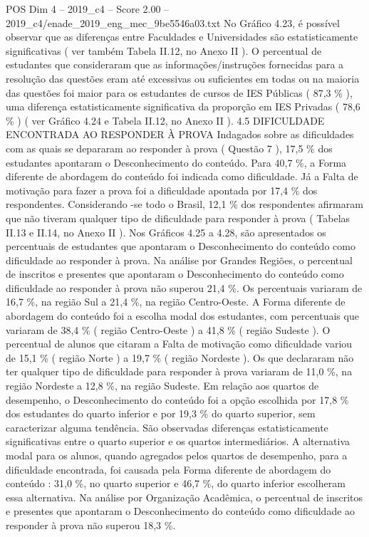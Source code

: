 \begin{textsample}{POS Dim 4 – 2019\_c4 – Score 2.00 – 2019\_c4/enade\_2019\_eng\_mec\_9be5546a03.txt}
No Gráfico 4.23, é possível observar que as diferenças entre Faculdades e Universidades são estatisticamente significativas ( ver também Tabela II.12, no Anexo II ).
O percentual de estudantes que consideraram que as informações/instruções fornecidas para a resolução das questões eram até excessivas ou suficientes em todas ou na maioria das questões foi maior para os estudantes de cursos de IES Públicas ( 87,3 \% ), uma diferença estatisticamente significativa da proporção em IES Privadas ( 78,6 \% ) ( ver Gráfico 4.24 e Tabela II.12, no Anexo II ). 4.5 DIFICULDADE ENCONTRADA AO RESPONDER À PROVA Indagados sobre as dificuldades com as quais se depararam ao responder à prova ( Questão 7 ), 17,5 \% dos estudantes apontaram o Desconhecimento do conteúdo.
Para 40,7 \%, a Forma diferente de abordagem do conteúdo foi indicada como dificuldade.
Já a Falta de motivação para fazer a prova foi a dificuldade apontada por 17,4 \% dos respondentes.
Considerando -se todo o Brasil, 12,1 \% dos respondentes afirmaram que não tiveram qualquer tipo de dificuldade para responder à prova ( Tabelas II.13 e II.14, no Anexo II ).
Nos Gráficos 4.25 a 4.28, são apresentados os percentuais de estudantes que apontaram o Desconhecimento do conteúdo como dificuldade ao responder à prova.
Na análise por Grandes Regiões, o percentual de inscritos e presentes que apontaram o Desconhecimento do conteúdo como dificuldade ao responder à prova não superou 21,4 \%.
Os percentuais variaram de 16,7 \%, na região Sul a 21,4 \%, na região Centro-Oeste.
A Forma diferente de abordagem do conteúdo foi a escolha modal dos estudantes, com percentuais que variaram de 38,4 \% ( região Centro-Oeste ) a 41,8 \% ( região Sudeste ).
O percentual de alunos que citaram a Falta de motivação como dificuldade variou de 15,1 \% ( região Norte ) a 19,7 \% ( região Nordeste ).
Os que declararam não ter qualquer tipo de dificuldade para responder à prova variaram de 11,0 \%, na região Nordeste a 12,8 \%, na região Sudeste.
Em relação aos quartos de desempenho, o Desconhecimento do conteúdo foi a opção escolhida por 17,8 \% dos estudantes do quarto inferior e por 19,3 \% do quarto superior, sem caracterizar alguma tendência.
São observadas diferenças estatisticamente significativas entre o quarto superior e os quartos intermediários.
A alternativa modal para os alunos, quando agregados pelos quartos de desempenho, para a dificuldade encontrada, foi causada pela Forma diferente de abordagem do conteúdo : 31,0 \%, no quarto superior e 46,7 \%, do quarto inferior escolheram essa alternativa.
Na análise por Organização Acadêmica, o percentual de inscritos e presentes que apontaram o Desconhecimento do conteúdo como dificuldade ao responder à prova não superou 18,3 \%.

\end{textsample}
